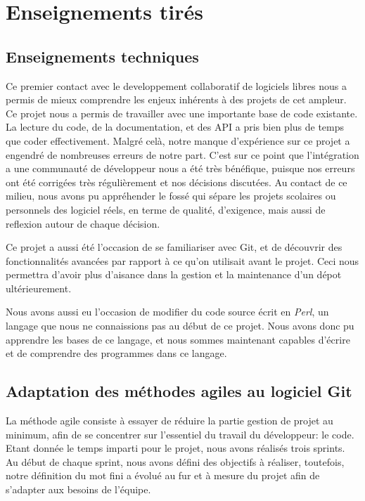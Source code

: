 \documentclass[a4paper, 12pt]{article}
\newcommand{\tech}[1]{\emph{#1}}
\begin{document}
\section{Enseignements tirés}

\subsection{Enseignements techniques}

Ce premier contact avec le developpement collaboratif de logiciels libres nous a permis de mieux comprendre les enjeux inhérents à des projets de cet ampleur. 
Ce projet nous a permis de travailler avec une importante base de code existante. La lecture du code, de la documentation, et des API a pris bien plus de temps que coder effectivement. Malgré celà, notre manque d'expérience sur ce projet a engendré de nombreuses erreurs de notre part.
C'est sur ce point que l'intégration a une communauté de développeur nous a été très bénéfique, puisque nos erreurs ont été corrigées très régulièrement et nos décisions discutées.
Au contact de ce milieu, nous avons pu appréhender le fossé qui sépare les projets scolaires ou personnels des logiciel réels, en terme de qualité, d'exigence, mais aussi de reflexion autour de chaque décision.


Ce projet a aussi été l'occasion de se familiariser avec Git, et de
découvrir des fonctionnalités avancées par rapport à ce qu'on utilisait
avant le projet. Ceci nous permettra d'avoir plus d'aisance dans la
gestion et la maintenance d'un dépot ultérieurement.

Nous avons aussi eu l'occasion de modifier du code source écrit en
\tech{Perl}, un langage que nous ne connaissions pas au début de ce
projet. Nous avons donc pu apprendre les bases de ce langage, et 
nous sommes maintenant capables d'écrire et de comprendre des
programmes dans ce langage.


\subsection{Adaptation des méthodes agiles au logiciel Git}

La méthode agile consiste à essayer de réduire la partie gestion de projet au minimum, afin de se concentrer sur l'essentiel du travail du développeur: le code.
Etant donnée le temps imparti pour le projet, nous avons réalisés trois sprints.
Au début de chaque sprint, nous avons défini des objectifs à réaliser, toutefois, notre définition du mot fini a évolué au fur et à mesure du projet afin de s'adapter aux besoins de l'équipe.
\end{document}

